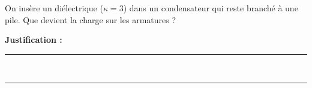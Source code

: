On insère un diélectrique ($\kappa = 3$) dans un condensateur qui reste branché à une pile. Que devient la charge sur les armatures ?

\choices

\noindent\textbf{Justification :} \hrulefill \\[2.5ex]
\rule{\linewidth}{0.4pt} \\[2.5ex]
\rule{\linewidth}{0.4pt}
\vfill

